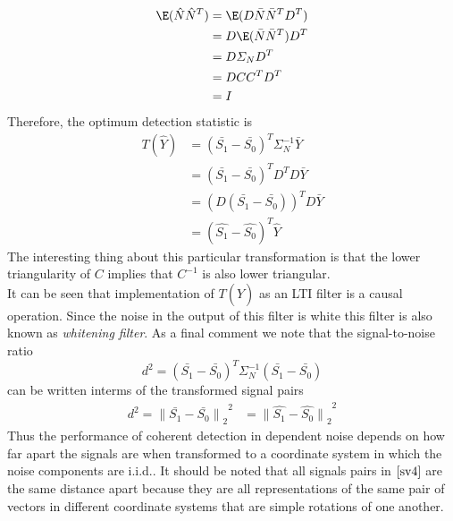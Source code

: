 \documentclass[12pt]{report}
\begin{document}
\begin{align*}
\E(\hat{N}\hat{N}^T)&= \E(D\bar{N}\bar{N}^TD^T)\\&= D\E(\bar{N}\bar{N}^T)D^T\\&= D\varSigma_{N}D^T\\&= DCC^TD^T\\&= I
\end{align*}
Therefore, the optimum detection statistic is
\begin{align*}
T(\hat{Y})&=(\bar{S_1}-\bar{S_0})^T\varSigma_{N}^{-1}\bar{Y}\\&= (\bar{S_1}-\bar{S_0})^TD^TD\bar{Y}\\&= (D(\bar{S_1}-\bar{S_0}))^TD\bar{Y}\\&= (\hat{S_1}-\hat{S_0})^T\hat{Y}
\end{align*}
The interesting thing about this particular transformation is that the lower triangularity of $C$ implies that $C^{-1}$ is also lower triangular. \\ \indent It can be seen that implementation of $T(\hat{Y})$ as an LTI filter is a causal operation. Since the noise in the output of this filter is white this filter is also known as \textit{whitening filter}.
\indent As a final comment we note that the signal-to-noise ratio \[d^2=(\bar{S_1}-\bar{S_0})^T\varSigma_{N}^{-1}(\bar{S_1}-\bar{S_0})\] can be written interms of the transformed signal pairs \begin{align}
\label{sv4}d^2={{\parallel\bar{S_1}-\bar{S_0}\parallel}_2}^2&= {{\parallel\hat{S_1}-\hat{S_0}\parallel}_2}^2
\end{align}
Thus the performance of coherent detection in dependent noise depends on how far apart the signals are when transformed to a coordinate system in which the noise components are i.i.d.. It should be noted that all signals pairs in $\eqref{sv4}$ are the same distance apart because they are all representations of the same pair of vectors in different coordinate systems that are simple rotations of one another.
\end{document}
